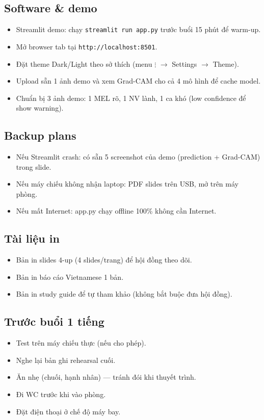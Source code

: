 \documentclass[11pt,a4paper]{article}
\begin{document}
\subsection{Software \& demo}
\begin{itemize}[leftmargin=*, itemsep=2pt]
  \item Streamlit demo: chạy \texttt{streamlit run app.py} trước buổi 15 phút để warm-up.
  \item Mở browser tab tại \texttt{http://localhost:8501}.
  \item Đặt theme Dark/Light theo sở thích (menu $\vdots$ $\rightarrow$ Settings $\rightarrow$ Theme).
  \item Upload sẵn 1 ảnh demo và xem Grad-CAM cho cả 4 mô hình để cache model.
  \item Chuẩn bị 3 ảnh demo: 1 MEL rõ, 1 NV lành, 1 ca khó (low confidence để show warning).
\end{itemize}

\subsection{Backup plans}
\begin{itemize}[leftmargin=*, itemsep=2pt]
  \item Nếu Streamlit crash: có sẵn 5 screenshot của demo (prediction + Grad-CAM) trong slide.
  \item Nếu máy chiếu không nhận laptop: PDF slides trên USB, mở trên máy phòng.
  \item Nếu mất Internet: app.py chạy offline 100\% không cần Internet.
\end{itemize}

\subsection{Tài liệu in}
\begin{itemize}[leftmargin=*, itemsep=2pt]
  \item Bản in slides 4-up (4 slides/trang) để hội đồng theo dõi.
  \item Bản in báo cáo Vietnamese 1 bản.
  \item Bản in study guide để tự tham khảo (không bắt buộc đưa hội đồng).
\end{itemize}

\subsection{Trước buổi 1 tiếng}
\begin{itemize}[leftmargin=*, itemsep=2pt]
  \item Test trên máy chiếu thực (nếu cho phép).
  \item Nghe lại bản ghi rehearsal cuối.
  \item Ăn nhẹ (chuối, hạnh nhân) --- tránh đói khi thuyết trình.
  \item Đi WC trước khi vào phòng.
  \item Đặt điện thoại ở chế độ máy bay.
\end{itemize}
\end{document}
